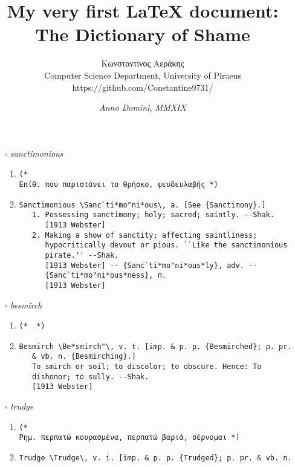 \documentclass{article}
\author{Κωνσταντίνος Αεράκης\\ {\small Computer Science Department, University of Piraeus}\\ {\tiny https://github.com/Constantine9731/}}
\title{My very first {\LaTeX} document: The Dictionary of Shame}
\date{\textit{Anno Domini, MMXIX}}
\begin{document}
	\maketitle
	\renewcommand{\labelenumi}{\Roman{enumi}}
	\begin{itemize}

\item[$\square$] \emph{ sanctimonious }
\begin{enumerate}
\item{
\begin{lstlisting}
(* 
Επίθ. που παριστάνει το θρήσκο, ψευδευλαβής *)
\end{lstlisting}}
\item{
\begin{lstlisting}
Sanctimonious \Sanc`ti*mo"ni*ous\, a. [See {Sanctimony}.]
   1. Possessing sanctimony; holy; sacred; saintly. --Shak.
      [1913 Webster]
   2. Making a show of sanctity; affecting saintliness;
      hypocritically devout or pious. ``Like the sanctimonious
      pirate.'' --Shak.
      [1913 Webster] -- {Sanc`ti*mo"ni*ous*ly}, adv. --
      {Sanc`ti*mo"ni*ous*ness}, n.
      [1913 Webster]
\end{lstlisting}}
\end{enumerate}
\item[$\square$] \emph{ besmirch }
\begin{enumerate}
\item{
\begin{lstlisting}
(*  *)
\end{lstlisting}}
\item{
\begin{lstlisting}
Besmirch \Be*smirch"\, v. t. [imp. & p. p. {Besmirched}; p. pr.
   & vb. n. {Besmirching}.]
   To smirch or soil; to discolor; to obscure. Hence: To
   dishonor; to sully. --Shak.
   [1913 Webster]
\end{lstlisting}}
\end{enumerate}
\item[$\square$] \emph{ trudge }
\begin{enumerate}
\item{
\begin{lstlisting}
(* 
Ρημ. περπατώ κουρασμένα, περπατώ βαριά, σέρνομαι *)
\end{lstlisting}}
\item{
\begin{lstlisting}
Trudge \Trudge\, v. i. [imp. & p. p. {Trudged}; p. pr. & vb. n.

\end{lstlisting}}
\end{enumerate}
\end{itemize}
\end{document}
